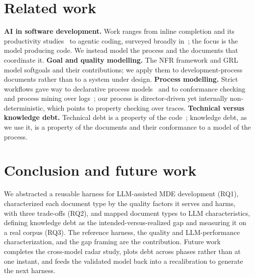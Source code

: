 \documentclass[sigconf]{acmart}
\begin{document}
\section{Related work}
\textbf{AI in software development.} Work ranges from inline completion and its productivity studies~\cite{chen2021codex,peng2023copilot,vaithilingam2022expectation} to agentic coding, surveyed broadly in~\cite{hou2024llm4se}; the focus is the model producing code. We instead model the process and the documents that coordinate it. \textbf{Goal and quality modelling.} The NFR framework and GRL model softgoals and their contributions; we apply them to development-process documents rather than to a system under design. \textbf{Process modelling.} Strict workflows gave way to declarative process models~\cite{pesic2006declare} and to conformance checking and process mining over logs~\cite{vanderaalst2016processmining}; our process is director-driven yet internally non-deterministic, which points to property checking over traces. \textbf{Technical versus knowledge debt.} Technical debt is a property of the code~\cite{cunningham1992wycash,kruchten2012techdebt}; knowledge debt, as we use it, is a property of the documents and their conformance to a model of the process.

\section{Conclusion and future work}
We abstracted a reusable harness for LLM-assisted MDE development (RQ1), characterized each document type by the quality factors it serves and harms, with three trade-offs (RQ2), and mapped document types to LLM characteristics, defining knowledge debt as the intended-versus-realized gap and measuring it on a real corpus (RQ3). The reference harness, the quality and LLM-performance characterization, and the gap framing are the contribution. Future work completes the cross-model radar study, plots debt across phases rather than at one instant, and feeds the validated model back into a recalibration to generate the next harness.



\end{document}
